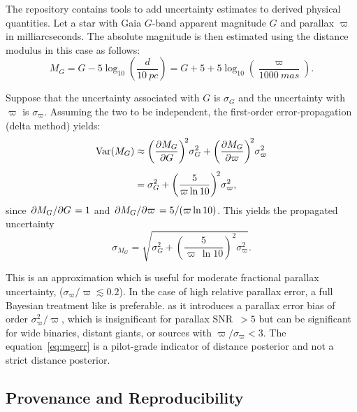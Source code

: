 \documentclass[preprint,12pt,authoryear]{elsarticle}
\newcommand{\parallax}{\varpi}
\begin{document}
The repository contains tools to add uncertainty estimates to derived physical quantities. Let a star with Gaia $G$-band apparent magnitude $G$ and parallax $\parallax$ in milliarcseconds. The absolute magnitude is then estimated using the distance modulus in this case as follows:
\begin{equation}
M_G = G - 5\log_{10}\!\left(\frac{d}{\SI{10}{pc}}\right)
     = G + 5 + 5\log_{10}\!\left(\frac{\parallax}{\SI{1000}{mas}}\right).
\label{eq:mg}
\end{equation}

Suppose that the uncertainty associated with $G$ is $\sigma_G$ and the uncertainty with $\parallax$ is $\sigma_\parallax$. Assuming the two to be independent, the first‑order error‑propagation (delta method) yields:
\begin{align}
\operatorname{Var}(M_G)
 &\approx \left(\pdv{M_G}{G}\right)^{\!2}\!\sigma_G^{2}
   + \left(\pdv{M_G}{\parallax}\right)^{\!2}\!\sigma_{\parallax}^{2} \label{eq:delta_method} \\[4pt]
 &= \sigma_G^{2}
   + \left(\frac{5}{\parallax \ln 10}\right)^{\!2}\!\sigma_{\parallax}^{2},
\end{align}
since $\pdv*{M_G}{G}=1$ and $\pdv*{M_G}{\parallax}=5/(\parallax\ln 10)$. This yields the propagated uncertainty
\begin{equation}
\sigma_{M_G} = \sqrt{\sigma_G^{2}
      + \left(\frac{5}{\parallax\,\ln 10}\right)^{\!2}\sigma_{\parallax}^{2}} .
\label{eq:mgerr}
\end{equation}

This is an approximation which is useful for moderate fractional parallax uncertainty, ($\sigma_\parallax / \parallax \lesssim 0.2$). In the case of high relative parallax error, a full Bayesian treatment like \citet{BailerJones2021} is preferable. \citet{BailerJones2021} as it introduces a parallax error bias of order $\sigma_\parallax^2 / \parallax$, which is insignificant for parallax SNR~$>5$ but can be significant for wide binaries, distant giants, or sources with $\parallax / \sigma_\parallax < 3$. The equation~\eqref{eq:mgerr} is a pilot-grade indicator of distance posterior and not a strict distance posterior.


\subsection{Provenance and Reproducibility}
\label{sec:provenance}
\end{document}
